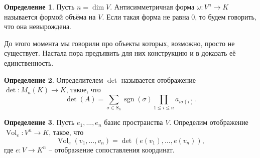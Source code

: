 \documentclass[10pt,a4paper,oneside]{book} %
\theoremstyle{definition}
\newtheorem*{defn}{Определение}
\newcommand{\Vol}{\operatorname{Vol}}
\newcommand{\sgn}{\operatorname{sgn}}
\def\dfn{\begin{defn}}
\def\edfn{\end{defn}}
\begin{document}
\begin{defn}
Пусть $n=\dim V$. Антисимметричная форма $\omega \colon V^n \to K $ называется формой объёма на $V$. Если такая форма не равна 0, то будем говорить, что она невырождена. 
\end{defn}



До этого момента мы говорили про объекты которых, возможно, просто не существует. Настала пора предъявить для них конструкцию и в  доказать её единственность.

\dfn  Определителем $\det$ называется отображение $\det \colon M_n(K) \to K$, такое, что $$\det(A)=\sum_{\sigma \in S_n} \sgn(\sigma)\prod_{1\leq i\leq n} a_{i\sigma(i)}.$$
\edfn

\dfn Пусть $e_1,\dots,e_n$ базис пространства $V$. Определим отображение $\Vol_e \colon V^n \to K$, такое, что 
$$\Vol_e(v_1,\dots,v_n)=\det(e(v_1),\dots, e(v_n)),$$ 
где $e\colon V \to K^n$ -- отображение сопоставления координат.
\edfn
\end{document}
